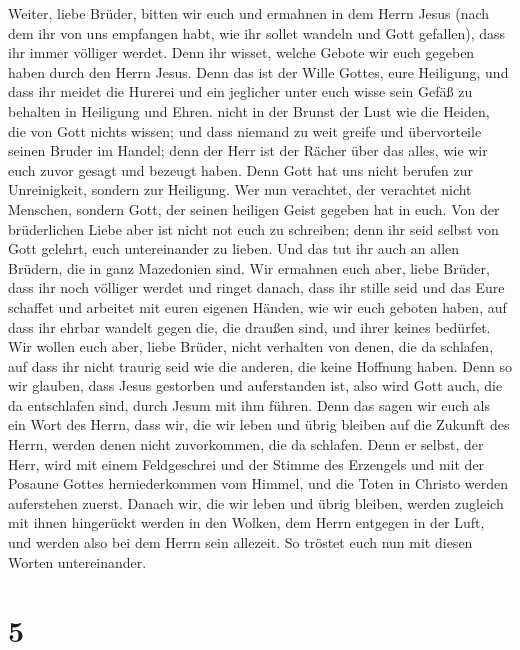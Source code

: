  Weiter, liebe Brüder, bitten wir euch und ermahnen in dem
Herrn Jesus (nach dem ihr von uns empfangen habt, wie ihr sollet wandeln
und Gott gefallen), dass ihr immer völliger werdet.  Denn
ihr wisset, welche Gebote wir euch gegeben haben durch den Herrn Jesus.
 Denn das ist der Wille Gottes, eure Heiligung, und dass
ihr meidet die Hurerei  und ein jeglicher unter euch wisse
sein Gefäß zu behalten in Heiligung und Ehren.  nicht in
der Brunst der Lust wie die Heiden, die von Gott nichts wissen;
 und dass niemand zu weit greife und übervorteile seinen
Bruder im Handel; denn der Herr ist der Rächer über das alles, wie wir
euch zuvor gesagt und bezeugt haben.  Denn Gott hat uns
nicht berufen zur Unreinigkeit, sondern zur Heiligung. 
Wer nun verachtet, der verachtet nicht Menschen, sondern Gott, der
seinen heiligen Geist gegeben hat in euch.  Von der
brüderlichen Liebe aber ist nicht not euch zu schreiben; denn ihr seid
selbst von Gott gelehrt, euch untereinander zu lieben. 
Und das tut ihr auch an allen Brüdern, die in ganz Mazedonien sind. Wir
ermahnen euch aber, liebe Brüder, dass ihr noch völliger werdet
 und ringet danach, dass ihr stille seid und das Eure
schaffet und arbeitet mit euren eigenen Händen, wie wir euch geboten
haben,  auf dass ihr ehrbar wandelt gegen die, die
draußen sind, und ihrer keines bedürfet.  Wir wollen euch
aber, liebe Brüder, nicht verhalten von denen, die da schlafen, auf dass
ihr nicht traurig seid wie die anderen, die keine Hoffnung haben.
 Denn so wir glauben, dass Jesus gestorben und
auferstanden ist, also wird Gott auch, die da entschlafen sind, durch
Jesum mit ihm führen.  Denn das sagen wir euch als ein
Wort des Herrn, dass wir, die wir leben und übrig bleiben auf die
Zukunft des Herrn, werden denen nicht zuvorkommen, die da schlafen.
 Denn er selbst, der Herr, wird mit einem Feldgeschrei
und der Stimme des Erzengels und mit der Posaune Gottes herniederkommen
vom Himmel, und die Toten in Christo werden auferstehen zuerst.
 Danach wir, die wir leben und übrig bleiben, werden
zugleich mit ihnen hingerückt werden in den Wolken, dem Herrn entgegen
in der Luft, und werden also bei dem Herrn sein allezeit.
 So tröstet euch nun mit diesen Worten untereinander.

\hypertarget{section-4}{%
\section{5}\label{section-4}}

